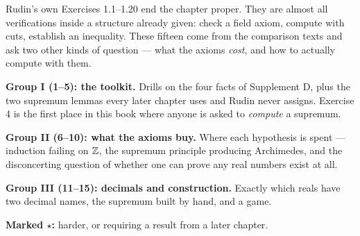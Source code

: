 
\begin{roadmap}
Rudin's own Exercises 1.1--1.20 end the chapter proper. They are almost all
verifications inside a structure already given: check a field axiom, compute
with cuts, establish an inequality. These fifteen come from the comparison
texts and ask two other kinds of question --- what the axioms \emph{cost},
and how to actually compute with them.

\medskip
\raggedright
\textbf{Group I (1--5): the toolkit.} Drills on the four facts of Supplement
D, plus the two supremum lemmas every later chapter uses and Rudin never
assigns. Exercise 4 is the first place in this book where anyone is asked to
\emph{compute} a supremum.

\medskip
\textbf{Group II (6--10): what the axioms buy.} Where each hypothesis is
spent --- induction failing on $\mathbb{Z}$, the supremum principle producing
Archimedes, and the disconcerting question of whether one can prove any
real numbers exist at all.

\medskip
\textbf{Group III (11--15): decimals and construction.} Exactly which reals
have two decimal names, the supremum built by hand, and a game.

\medskip
\textbf{Marked $\star$:} harder, or requiring a result from a later chapter.
\end{roadmap}


